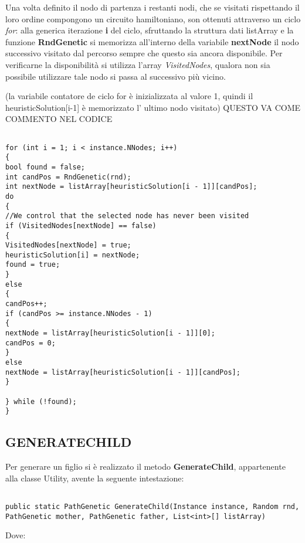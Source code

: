 \documentclass[11pt]{article}
\begin{document}
Una volta definito il nodo di partenza i restanti nodi, che se visitati rispettando il loro ordine compongono un circuito hamiltoniano, son ottenuti attraverso un ciclo \textit{for}: alla generica iterazione \textbf{i} del ciclo, sfruttando la struttura dati listArray e la funzione \textbf{RndGenetic} si memorizza all'interno della variabile \textbf{nextNode} il nodo successivo visitato dal percorso sempre che questo sia ancora disponibile. Per verificarne la disponibilità si utilizza l'array \textit{VisitedNodes}, qualora non sia possibile utilizzare tale nodo si passa al successivo più vicino.


(la variabile contatore de ciclo for è inizializzata al valore 1, quindi il heuristicSolution[i-1] è memorizzato l' ultimo nodo visitato)  QUESTO VA COME COMMENTO NEL CODICE

\begin{lstlisting}

for (int i = 1; i < instance.NNodes; i++)
{
bool found = false;
int candPos = RndGenetic(rnd);
int nextNode = listArray[heuristicSolution[i - 1]][candPos];
do
{
//We control that the selected node has never been visited
if (VisitedNodes[nextNode] == false)
{
VisitedNodes[nextNode] = true;
heuristicSolution[i] = nextNode;
found = true;
}
else
{
candPos++;
if (candPos >= instance.NNodes - 1)
{
nextNode = listArray[heuristicSolution[i - 1]][0];
candPos = 0;
}
else
nextNode = listArray[heuristicSolution[i - 1]][candPos];
}

} while (!found);
}

\end{lstlisting}

\subsection*{GENERATECHILD}

Per generare un figlio si è realizzato il metodo \textbf{GenerateChild}, appartenente alla classe Utility, avente la seguente intestazione:

\begin{lstlisting}

public static PathGenetic GenerateChild(Instance instance, Random rnd, PathGenetic mother, PathGenetic father, List<int>[] listArray)

\end{lstlisting}

Dove:
\end{document}
